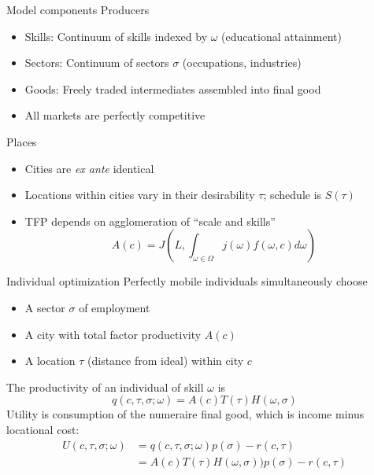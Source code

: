 \documentclass[10pt,notes=hide]{beamer}
\begin{document}
\begin{frame}{Model components}
Producers
\begin{itemize}
\item Skills: Continuum of skills indexed by $\omega$ (educational attainment)
\item Sectors: Continuum of sectors $\sigma$ (occupations, industries)
\item Goods: Freely traded intermediates assembled into final good
\item All markets are perfectly competitive
\end{itemize}
Places
\begin{itemize}
\item Cities are \emph{ex ante} identical
\item Locations within cities vary in their desirability $\tau$; schedule is $S(\tau)$ 
\item TFP depends on agglomeration of ``scale and skills''
\[
A(c)=J\left(L,\int_{\omega\in\Omega}j(\omega)f(\omega,c)d\omega\right)
\]
\end{itemize}
\end{frame}
\begin{frame}{Individual optimization}
Perfectly mobile individuals simultaneously choose
\begin{itemize}
\item A sector $\sigma$ of employment
\item A city with total factor productivity $A(c)$
\item A location $\tau$ (distance from ideal) within city $c$
\end{itemize}
The productivity of an individual of skill $\omega$ is
\[
q(c,\tau,\sigma;\omega)=A(c)T(\tau)H(\omega,\sigma)
\]
Utility is consumption of the numeraire final good, which is income minus locational cost:
\begin{align*}
U(c,\tau,\sigma;\omega) & =q(c,\tau,\sigma;\omega)p(\sigma)-r(c,\tau)\\
 & =A(c)T(\tau)H(\omega,\sigma))p(\sigma)-r(c,\tau)
\end{align*}
\end{frame}
\end{document}
